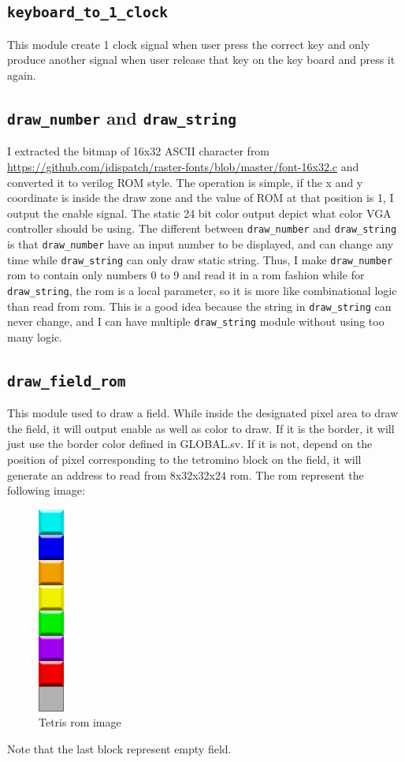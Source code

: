 \documentclass[scale = 0.9]{article}
\newcommand{\code}[1]{\colorbox{light-gray}{\texttt{#1}}} %
\begin{document}
\subsection{\code{keyboard\_to\_1\_clock}}
This module create 1 clock signal when user press the correct key and only produce
another signal when user release that key on the key board and press it again.

\subsection{\code{draw\_number} and \code{draw\_string}}
I extracted the bitmap of 16x32 ASCII character from \url{https://github.com/idispatch/raster-fonts/blob/master/font-16x32.c}
and converted it to verilog ROM style. The operation is simple, if the x and y coordinate
is inside the draw zone and the value of ROM at that position is 1, I output the enable
signal. The static 24 bit color output depict what color VGA controller should be using.
The different between \code{draw\_number} and \code{draw\_string} is that \code{draw\_number}
have an input number to be displayed, and can change any time while \code{draw\_string} can only
draw static string. Thus, I make \code{draw\_number} rom to contain only numbers 0 to 9
and read it in a rom fashion while for \code{draw\_string}, the rom is a local parameter,
so it is more like combinational logic than read from rom. This is a good idea because the
string in \code{draw\_string} can never change, and I can have multiple \code{draw\_string}
module without using too many logic.

\subsection{\code{draw\_field\_rom}}
This module used to draw a field. While inside the designated pixel area to draw the field, it will
output enable as well as color to draw. If it is the border, it will just use the border color
defined in GLOBAL.sv. If it is not, depend on the position of pixel corresponding to the
tetromino block on the field, it will generate an address to read from 8x32x32x24 rom. The
rom represent the following image:
\begin{figure}[H]
  \begin{center}
    \includegraphics{tetris.png}
    \caption{Tetris rom image}\label{tetris_rom}
  \end{center}
\end{figure}
Note that the last block represent empty field.
\end{document}
